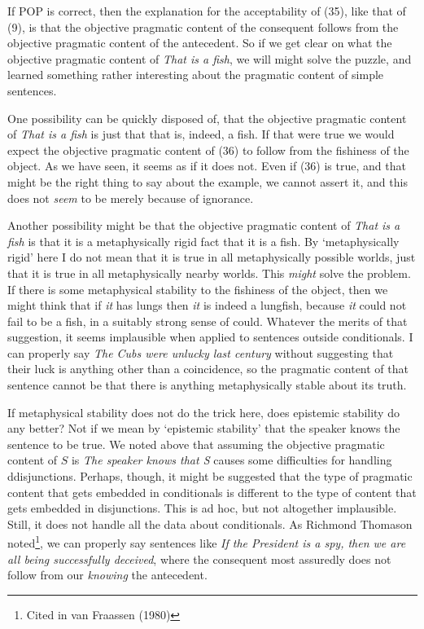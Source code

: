If POP is correct, then the explanation for the acceptability of (35), like that of (9), is that the objective pragmatic content of the consequent follows from the objective pragmatic content of the antecedent. So if we get clear on what the objective pragmatic content of \textit{That is a fish}, we will might solve the puzzle, and learned something rather interesting about the pragmatic content of simple sentences. 

One possibility can be quickly disposed of, that the objective pragmatic content of \textit{That is a fish} is just that that is, indeed, a fish. If that were true we would expect the objective pragmatic content of (36) to follow from the fishiness of the object. As we have seen, it seems as if it does not. Even if (36) is true, and that might be the right thing to say about the example, we cannot assert it, and this does not \textit{seem} to be merely because of ignorance.

Another possibility might be that the objective pragmatic content of \textit{That is a fish} is that it is a metaphysically rigid fact that it is a fish. By `metaphysically rigid' here I do not mean that it is true in all metaphysically possible worlds, just that it is true in all metaphysically nearby worlds. This \textit{might} solve the problem. If there is some metaphysical stability to the fishiness of the object, then we might think that if \textit{it} has lungs then \textit{it} is indeed a lungfish, because \textit{it} could not fail to be a fish, in a suitably strong sense of could. Whatever the merits of that suggestion, it seems implausible when applied to sentences outside conditionals. I can properly say \textit{The Cubs were unlucky last century} without suggesting that their luck is anything other than a coincidence, so the pragmatic content of that sentence cannot be that there is anything metaphysically stable about its truth.

If metaphysical stability does not do the trick here, does epistemic stability do any better? Not if we mean by `epistemic stability' that the speaker knows the sentence to be true. We noted above that assuming the objective pragmatic content of \(S\) is \textit{The speaker knows that S} causes some difficulties for handling ddisjunctions. Perhaps, though, it might be suggested that the type of pragmatic content that gets embedded in conditionals is different to the type of content that gets embedded in disjunctions. This is ad hoc, but not altogether implausible. Still, it does not handle all the data about conditionals. As Richmond Thomason noted\footnote{Cited in van Fraassen (1980)}, we can properly say sentences like \textit{If the President is a spy, then we are all being successfully deceived}, where the consequent most assuredly does not follow from our \textit{knowing} the antecedent.

